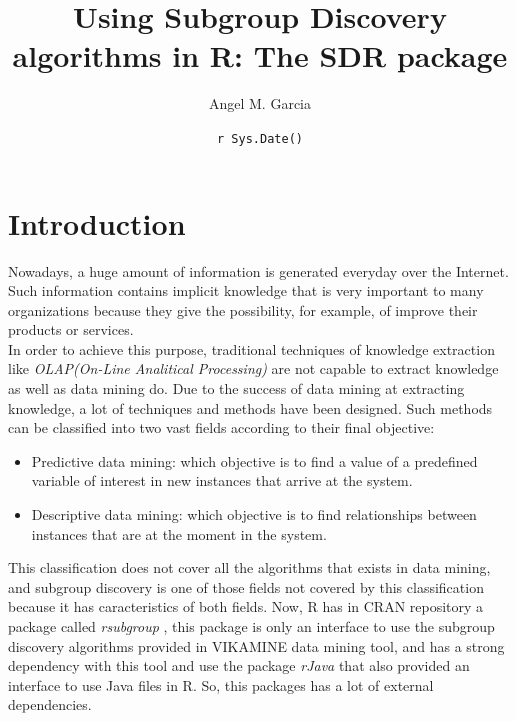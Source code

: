\documentclass[]{article}
\title{Using Subgroup Discovery algorithms in R: The \textbf{SDR} package}
\author{Angel M. Garcia}
\date{\texttt{r Sys.Date()}}
\begin{document}
\maketitle


\section{Introduction}\label{introduction}

Nowadays, a huge amount of information is generated everyday over the
Internet. Such information contains implicit knowledge that is very
important to many organizations because they give the possibility, for
example, of improve their products or services.\\In order to achieve
this purpose, traditional techniques of knowledge extraction like
\emph{OLAP(On-Line Analitical Processing)} are not capable to extract
knowledge as well as data mining do. Due to the success of data mining
at extracting knowledge, a lot of techniques and methods have been
designed. Such methods can be classified into two vast fields according
to their final objective:\\

\begin{itemize}

\item Predictive data mining: which objective is to find a value of a predefined variable of interest in new instances that arrive at the system.  
\item Descriptive data mining: which objective is to find relationships between instances that are at the moment in the system. 

\end{itemize}

This classification does not cover all the algorithms that exists in
data mining, and subgroup discovery is one of those fields not covered
by this classification because it has caracteristics of both fields.
Now, R has in CRAN repository a package called \emph{rsubgroup}
\cite{rsubgroup}, this package is only an interface to use the subgroup
discovery algorithms provided in VIKAMINE \cite{vikamine} data mining
tool, and has a strong dependency with this tool and use the package
\emph{rJava} \cite{rjava} that also provided an interface to use Java
files in R. So, this packages has a lot of external dependencies.
\end{document}
